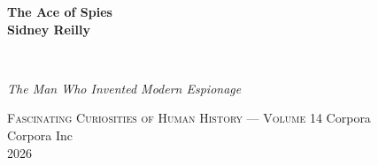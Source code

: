 \clearpage
\vspace*{1.5in}
\begin{center}
  \begin{minipage}{\textwidth}
    \centering
    \Huge\bfseries
    \linespread{1.25}\selectfont
    The Ace of Spies\\[0.5em]
    Sidney Reilly
  \end{minipage}
  \\[3em]
  {\Large\itshape\linespread{1.3}\selectfont
  The Man Who Invented Modern Espionage\par}
  \vspace{2em}
  {\small\scshape Fascinating Curiosities of Human History — Volume 14}
  \vfill
  {\large Corpora}
  \\[1em]
  {\large Corpora Inc}
  \\[1em]
  {\large 2026}
\end{center}
\clearpage
